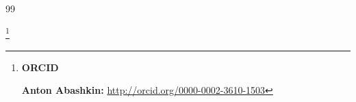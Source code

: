 \begin{thebibliography}{99}










\end{thebibliography}









\RuDate	



\bigskip





\makeentitle



\thanks{{\bf ORCID}





{\bf Anton Abashkin:} \url{http://orcid.org/0000-0002-3610-1503}

}







\EngRef















